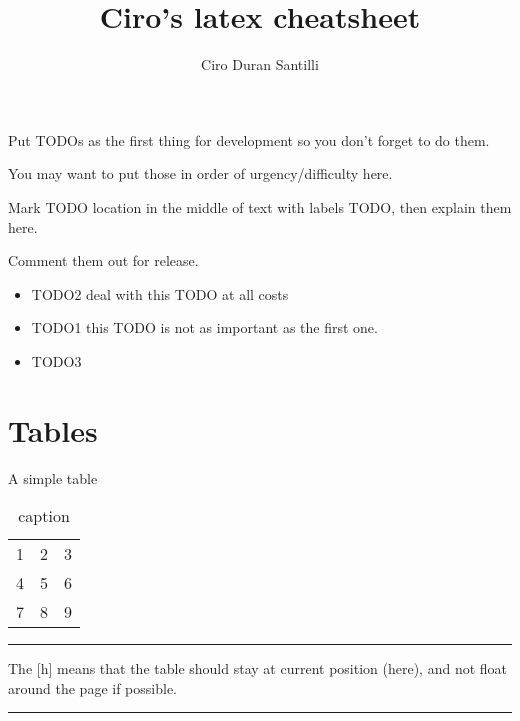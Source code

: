 \documentclass[12pt]{article}
\title{Ciro's latex cheatsheet}
\author{Ciro Duran Santilli}
\newcommand{\inOut}[1]{#1}
\begin{document}

\begin{remark}

Put TODOs as the first \label{TODO2} thing for development so you don't forget to do them.

You may want to put those in order of urgency/difficulty here.

Mark TODO location in \label{TODO1} the middle of text with labels TODO, then explain them here.

Comment them out for release.

\end{remark}

\begin{itemize}
  \item TODO2 deal with this TODO at all costs
  \item TODO1 this TODO is not as important as the first one.
  \item TODO3
\end{itemize}

\newpage



\tableofcontents
\newpage

\section{Tables}

\begin{example} \label{expTab1}
A simple table

\inOut{
\begin{table}[h]
  \centering
  \begin{tabular}{ccc}
    1 & 2 & 3 \\
    4 & 5 & 6 \\
    7 & 8 & 9 \\
  \end{tabular}
  \caption{caption}
  \label{tab1}
\end{table}
}

\end{example}\hrule

\begin{remark} \label{remTab1}
  The [h] means that the table should stay at current position (here), and not float around the page if possible.
\end{remark}\hrule
\end{document}
